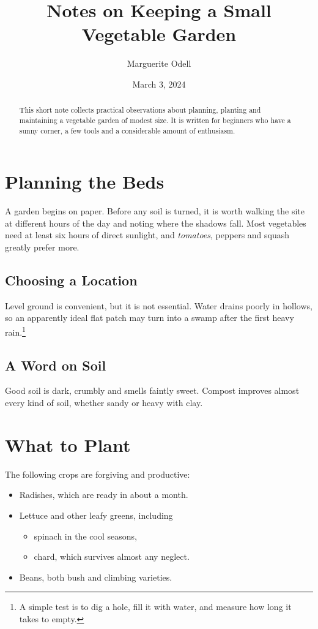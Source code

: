 \documentclass[11pt,letterpaper]{article}
\title{Notes on Keeping a Small Vegetable Garden}
\author{Marguerite Odell}
\date{March 3, 2024}
\begin{document}
\maketitle

\begin{abstract}
This short note collects practical observations about planning, planting and
maintaining a vegetable garden of modest size. It is written for beginners who
have a sunny corner, a few tools and a considerable amount of enthusiasm.
\end{abstract}

\section{Planning the Beds}
A garden begins on paper. Before any soil is turned, it is worth walking the
site at different hours of the day and noting where the shadows fall. Most
vegetables need at least six hours of direct sunlight, and
\emph{tomatoes}, peppers and squash greatly prefer more.

\subsection{Choosing a Location}
Level ground is convenient, but it is not essential. Water drains poorly in
hollows, so an apparently ideal flat patch may turn into a swamp after the
first heavy rain.\footnote{A simple test is to dig a hole, fill it with water,
and measure how long it takes to empty.}

\subsection*{A Word on Soil}
Good soil is dark, crumbly and smells faintly sweet. Compost improves almost
every kind of soil, whether sandy or heavy with clay.

\section{What to Plant}
The following crops are forgiving and productive:
\begin{itemize}
\item Radishes, which are ready in about a month.
\item Lettuce and other leafy greens, including
  \begin{itemize}
  \item spinach in the cool seasons,
  \item chard, which survives almost any neglect.
  \end{itemize}
\item Beans, both bush and climbing varieties.
\end{itemize}
\end{document}
